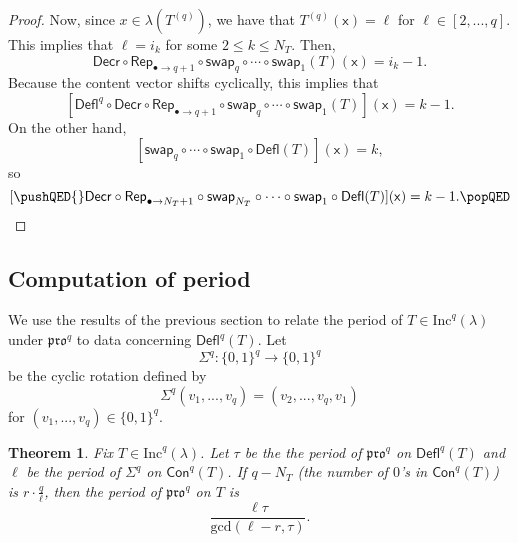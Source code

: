 \documentclass[12pt]{amsart}
\newcommand{\x}{\ensuremath{\mathsf{x}}}
\newtheorem{theorem}{Theorem}[section]
\theoremstyle{definition}
\theoremstyle{remark}
\numberwithin{equation}{section}
\newcommand{\inc}{\ensuremath{\mathrm{Inc}}}
\newcommand{\pro}{\mathfrak{pro}}
\newcommand{\swap}{\ensuremath{\mathsf{swap}}}
\newcommand{\decr}{\ensuremath{\mathsf{Decr}}}
\newcommand{\rep}{\ensuremath{\mathsf{Rep}}}
\newcommand{\deflate}{\ensuremath{\mathsf{Defl}}}
\newcommand{\content}{\ensuremath{\mathsf{Con}}}
\begin{document}
\begin{proof}
Now, since $x \in \lambda(T^{(q)})$, we have that $T^{(q)}(\x) = \ell$ for $\ell \in [2,...,q]$. This implies that $\ell = i_k$ for some $2 \leq k \leq N_T$. Then, 
\[
\decr \circ \rep_{\bullet \to q+1} \circ \swap_q \circ \cdots \circ \swap_1 (T)(\x) = i_k-1.
\]
Because the content vector shifts cyclically, this implies that 
 \[
 [\deflate^q \circ \decr \circ \rep_{\bullet \rightarrow q+1} \circ \swap_q \circ \cdots \circ \swap_1 (T)](\x) = k-1.
 \]
  On the other hand, 
  \[
  [\swap_q \circ \cdots \circ \swap_1 \circ \deflate(T)](\x) = k,
  \]
   so 
   \[
   [ \pushQED{\qed} \decr \circ \rep_{\bullet \rightarrow N_T + 1} \circ \swap_{N_T} \circ \cdots \circ \swap_1 \circ  \deflate(T)](\x) = k-1. \qedhere \popQED \] \let\qed\relax
\end{proof}

\subsection{Computation of period}\label{sec:period} We use the results of the previous section to relate the period of $T \in \inc^q(\lambda)$ under $\pro^q$ to data concerning $\deflate^q(T)$. Let 
\[\Sigma^q: \lbrace 0,1\rbrace^q \rightarrow \lbrace 0,1\rbrace^q\]
 be the cyclic rotation defined by 
 \[
 \Sigma^q(v_1,...,v_q) = (v_2,...,v_q,v_1)
 \]
  for $(v_1,...,v_q) \in \lbrace 0,1 \rbrace^q$. 
  
\begin{theorem}\label{thm:periodthm}
Fix $T \in \inc^q(\lambda)$. Let $\tau$ be the the period of $\pro^q$ on $\deflate^q(T)$ and $\ell$ be the period of $\Sigma^q$ on $\content^q(T)$. If $q-N_T$ (the number of $0$'s in $\content^q(T)$) is $r \cdot \frac{q}{\ell}$, then the period of $\pro^q$ on $T$ is \[\frac{\ell \tau}{\mathrm{gcd}(\ell-r,\tau)}.\]
\end{theorem} 
    
\end{document}
